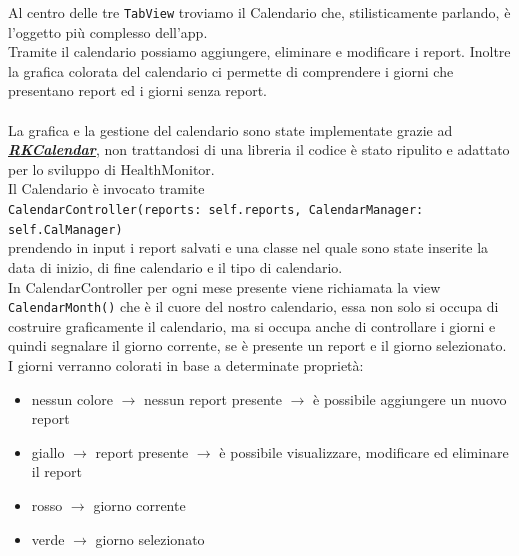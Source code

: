 \documentclass{article}
\begin{document}
Al centro delle tre \texttt{TabView} troviamo il Calendario che, stilisticamente parlando, è l'oggetto più complesso dell'app.\\
Tramite il calendario possiamo aggiungere, eliminare e modificare i report. Inoltre la grafica colorata del calendario ci permette di comprendere i giorni che presentano report ed i giorni senza report. \\
\\
La grafica e la gestione del calendario sono state implementate grazie ad \textbf{\textit{\href{https://github.com/RaffiKian/RKCalendar}{RKCalendar}}}, non trattandosi di una libreria il codice è stato ripulito e adattato per lo sviluppo di HealthMonitor.\\
Il Calendario è invocato tramite \\
\texttt{CalendarController(reports: self.reports, CalendarManager: self.CalManager)} \\
prendendo in input i report salvati e una classe nel quale sono state inserite la data di inizio, di fine calendario e il tipo di calendario.\\
In CalendarController per ogni mese presente viene richiamata la view \texttt{CalendarMonth()} che è il cuore del nostro calendario, essa non solo si occupa di costruire graficamente il calendario, ma si occupa anche di controllare i giorni e quindi segnalare il giorno corrente, se è presente un report e il giorno selezionato. I giorni verranno colorati in base a determinate proprietà:
\begin{itemize}
  \item nessun colore $\rightarrow$ nessun report presente $\rightarrow$ è possibile aggiungere un nuovo report
  \item giallo $\rightarrow$ report presente $\rightarrow$ è possibile visualizzare, modificare ed eliminare il report
  \item rosso $\rightarrow$ giorno corrente 
  \item verde $\rightarrow$ giorno selezionato
\end{itemize}
\end{document}
